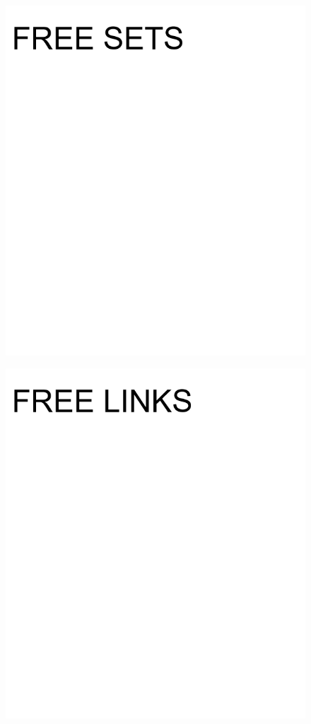 \documentclass[17pt]{extreport}
\begin{document}
        \begin{figure}
		\centering
		\includegraphics[width=8.0in]{imageset/uploadimages/freesets.png}
	\end{figure}	
        \begin{figure}
		\centering
		\includegraphics[width=8.0in]{imageset/uploadimages/freelinks.png}
	\end{figure}	
	
	
\end{document}
